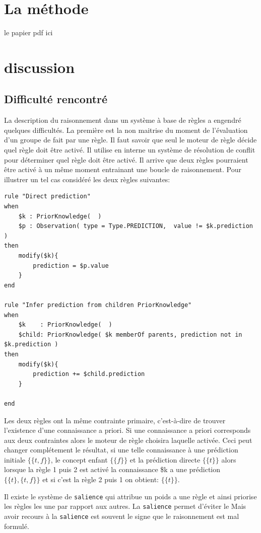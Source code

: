 \begin{refsegment}
\section{La méthode}\label{sec:methode}
le papier
pdf ici


\section{discussion}

\subsection{Difficulté rencontré}
La description du raisonnement dans un système à base de règles a engendré quelques difficultés. La première est la non maitrise du moment de l'évaluation d'un groupe de fait par une règle. Il faut savoir que seul le moteur de règle décide quel règle doit être activé. Il utilise en interne un système de résolution de conflit pour déterminer quel règle doit être activé. Il arrive que deux règles pourraient être activé à un même moment entrainant une boucle de raisonnement. Pour illustrer un tel cas considéré les deux règles suivantes:

\begin{lstlisting}[style=drl-style,caption=conflit]
rule "Direct prediction"
when
	$k : PriorKnowledge(  )
	$p : Observation( type = Type.PREDICTION,  value != $k.prediction )
then
	modify($k){
		prediction = $p.value
	}
end

rule "Infer prediction from children PriorKnowledge"
when
	$k    : PriorKnowledge(  )
	$child: PriorKnowledge( $k memberOf parents, prediction not in $k.prediction )
then
	modify($k){
		prediction += $child.prediction
	}

end
\end{lstlisting}

Les deux règles ont la même contrainte primaire, c'est-à-dire de trouver l'existence d'une connaissance a priori. Si une connaissance a priori corresponds aux deux contraintes alors le moteur de règle choisira laquelle activée. Ceci peut changer complétement le résultat, si une telle connaissance à une prédiction initiale $\{\{t,f\}\}$, le concept enfant  $\{\{f\}\}$ et la prédiction directe $\{\{t\}\}$ alors lorsque la règle 1 puis 2 est activé la connaissance \$k a une prédiction  $\{\{t\},\{t,f\}\}$ et si c'est la règle 2 puis 1 on obtient:  $\{\{t\}\}$.

Il existe le système de \texttt{salience} qui attribue un poids a une règle et ainsi priorise les règles les une par rapport aux autres. La \texttt{salience} permet d'éviter le Mais avoir recours à la \texttt{salience}  est souvent le signe que le raisonnement est mal formulé. 


\end{refsegment}
